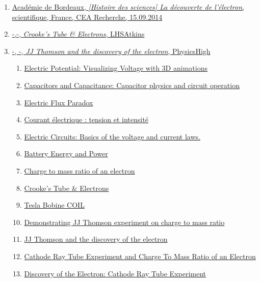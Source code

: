 \documentclass[../main.tex]{subfiles}
\begin{document}
\begin{enumerate}
    \item \href{https://www.youtube.com/watch?v=WHoH5m83Ga0}{Académie de Bordeaux, \textit{[Histoire des sciences] La découverte de l'électron}, scientifique, France, CEA Recherche, 15.09.2014}
    \item \href{https://www.youtube.com/watch?v=Ka3v5dIQGOI}{-,-, \textit{Crooke's Tube \& Electrons}, LHSAtkins}
    \item \href{https://www.youtube.com/watch?v=GR9A7Hd4mxQ}{-, -, \textit{JJ Thomson and the discovery of the electron}, PhysicsHigh}
    \begin{enumerate}[1. ] 
    \item \href{h https://www.youtube.com/watch?v=-Rb9guSEeVE&list=PLkyBCj4JhHt8DFH9QysGWm4h_DOxT93fb}{Electric Potential: Visualizing Voltage with 3D animations}
    \item \href{https://www.youtube.com/watch?v=f_MZNsEqyQw&list=PLkyBCj4JhHt8DFH9QysGWm4h_DOxT93fb&index=16}{Capacitors and Capacitance: Capacitor physics and circuit operation}
     \item \href{https://www.youtube.com/watch?v=P0Jnx1BjIZM&list=PLkyBCj4JhHt8DFH9QysGWm4h_DOxT93fb&index=29}{Electric Flux Paradox}
     \item \href{https://www.youtube.com/watch?v=eMTuPhg-8Go&t=22s}{Courant électrique : tension et intensité}
     \item \href{https://www.youtube.com/watch?v=m4jzgqZu-4s}{Electric Circuits: Basics of the voltage and current laws.}
     \item \href{https://www.youtube.com/watch?v=u4FpbaMW5sk}{Battery Energy and Power}
      \item \href{https://www.youtube.com/watch?v=5YYVnHN7xwM}{Charge to mass ratio of an electron}
      \item \href{https://www.youtube.com/watch?v=Ka3v5dIQGOI}{Crooke's Tube & Electrons}
       \item \href{https://fr.wikipedia.org/wiki/Bobine_Tesla}{Tesla Bobine COIL}
      \item \href{https://www.youtube.com/watch?v=QuLtuM8bAMI}{Demonstrating JJ Thomson experiment on charge to mass ratio}
      \item \href{https://www.youtube.com/watch?v=GR9A7Hd4mxQ}{JJ Thomson and the discovery of the electron}
      \item \href{https://www.youtube.com/watch?v=i6zyPOSreCg}{Cathode Ray Tube Experiment and Charge To Mass Ratio of an Electron}
    \item \href{https://www.youtube.com/watch?v=Rb6MguN0Uj4}{Discovery of the Electron: Cathode Ray Tube Experiment}


\end{enumerate}
\end{enumerate}
\end{document}
